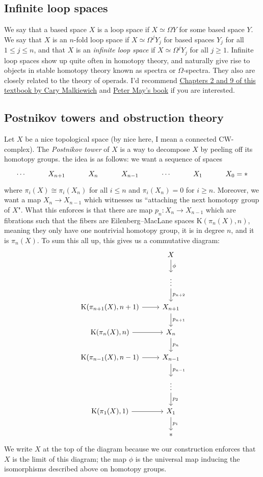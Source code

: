 \documentclass[10pt]{amsart}
\theoremstyle{definition}
\newcommand{\cdef}[1]{\textcolor{Bittersweet}{#1}}
\begin{document}
\subsection*{Infinite loop spaces}
We say that a based space $X$ is a loop space if $X \simeq \Omega Y$ for some based space $Y$. We say that $X$ is an $n$-fold loop space if $X \simeq \Omega^j Y_j$ for based spaces $Y_j$ for all $1 \leq j \leq n$, and that $X$ is an \cdef{\emph{infinite loop space}} if $X \simeq \Omega^j Y_j$ for all $j \geq 1$. Infinite loop spaces show up quite often in homotopy theory, and naturally give rise to objects in stable homotopy theory known as spectra or $\Omega$-spectra. They also are closely related to the theory of operads. I'd recommend
\href{https://people.math.binghamton.edu/malkiewich/spectra_book_draft.pdf}{Chapters 2 and 9 of this textbook by Cary Malkiewich}
and
\href{https://www.math.uchicago.edu/~may/PAPERS/18.pdf}{Peter May's book} if you are interested.

\subsection*{Postnikov towers and obstruction theory}
Let $X$ be a nice topological space (by nice here, I mean a connected CW-complex). The \cdef{\emph{Postnikov tower}} of $X$ is a way to decompose $X$ by peeling off its homotopy groups. the idea is as follows: we want a sequence of spaces
\[
\begin{tikzcd}
	\cdots & {X_{n+1}} & {X_n} & {X_{n-1}} & \cdots & {X_1} & {X_0 = *}
\end{tikzcd}
\]
where $\pi_i(X) \cong \pi_i(X_n)$ for all $i \leq n$ and $\pi_i(X_n) = 0$ for $i \geq n$. Moreover, we want a map $X_n \to X_{n-1}$ which witnesses us ``attaching the next homotopy group of $X$". What this enforces is that there are map $p_n:X_n \to X_{n-1}$ which are fibrations such that the fibers are Eilenberg--MacLane spaces $\text{K}(\pi_n(X), n)$, meaning they only have one nontrivial homotopy group, it is in degree $n$, and it is $\pi_n(X)$. To sum this all up, this gives us a commutative diagram:
\[\begin{tikzcd}
	& X \\
	& \vdots \\
	{\text{K}(\pi_{n+1}(X), n+1)} & {X_{n+1}} \\
	{\text{K}(\pi_n(X), n)} & {X_n} \\
	{\text{K}(\pi_{n-1}(X), n-1)} & {X_{n-1}} \\
	& \vdots \\
	{\text{K}(\pi_1(X), 1)} & {X_1} \\
	& {*}
	\arrow["\phi", from=1-2, to=2-2]
	\arrow["{p_{n+2}}", from=2-2, to=3-2]
	\arrow[from=3-1, to=3-2]
	\arrow["{p_{n+1}}", from=3-2, to=4-2]
	\arrow[from=4-1, to=4-2]
	\arrow["{p_{n}}", from=4-2, to=5-2]
	\arrow[from=5-1, to=5-2]
	\arrow["{p_{n-1}}", from=5-2, to=6-2]
	\arrow["{p_2}", from=6-2, to=7-2]
	\arrow[from=7-1, to=7-2]
	\arrow["{p_1}", from=7-2, to=8-2]
\end{tikzcd}\]
We write $X$ at the top of the diagram because we our construction enforces that $X$ is the limit of this diagram; the map $\phi$ is the universal map inducing the isomorphisms described above on homotopy groups.
\end{document}
